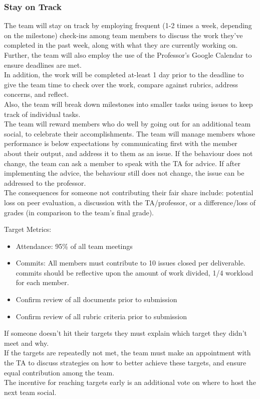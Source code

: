 \documentclass{article}
\begin{document}
\subsubsection*{Stay on Track}

\indent The team will stay on track by employing frequent (1-2 times a week, depending on the milestone)
check-ins among team members to discuss the work they've completed in the past week, along with
what they are currently working on.\\
\indent Further, the team will also employ the use of the Professor's Google Calendar to ensure deadlines are met.\\
\indent In addition, the work will be completed at-least 1 day prior to the deadline to give the team time to check over
the work, compare against rubrics, address concerns, and reflect.\\
\indent Also, the team will break down milestones into smaller tasks using issues to keep track of individual tasks.\\

\indent The team will reward members who do well by going out for an additional team social, to celebrate their accomplishments.
The team will manage members whose performance is below expectations by communicating first with the member
about their output, and address it to them as an issue. If the behaviour does not change, the team can ask a member
to speak with the TA for advice. If after implementing the advice, the behaviour still does not change, the issue can
be addressed to the professor.\\
\indent The consequences for someone not contributing their fair share include: potential loss on peer evaluation, a discussion
with the TA/professor, or a difference/loss of grades (in comparison to the team's final grade).

Target Metrics:
\begin{itemize}
  \item Attendance: 95\% of all team meetings
  \item Commits: All members must contribute to 10 issues closed per deliverable. 
  commits should be reflective upon the amount of work divided, 1/4 workload for each member.
  \item Confirm review of all documents prior to submission
  \item Confirm review of all rubric criteria prior to submission
\end{itemize}

If someone doesn't hit their targets they must explain which target they didn't meet and why.\\
\indent If the targets are repeatedly not met, the team must make an appointment with the TA to discuss strategies on
how to better achieve these targets, and ensure equal contribution among the team.\\
\indent The incentive for reaching targets early is an additional vote on where to host the next team social.\\
\end{document}
